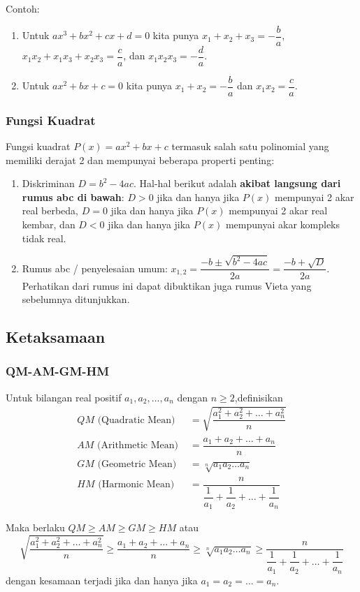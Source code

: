 Contoh:
\begin{enumerate}
\item Untuk $ax^3+bx^2+cx+d=0$ kita punya $x_1+x_2+x_3=-\dfrac{b}{a}$, $x_1x_2+x_1x_3+x_2x_3=\dfrac{c}{a}$, dan $x_1x_2x_3=-\dfrac{d}{a}$.
\item Untuk $ax^2+bx+c=0$ kita punya $x_1+x_2=-\dfrac{b}{a}$ dan $x_1x_2=\dfrac{c}{a}$.
\end{enumerate}
\subsubsection{Fungsi Kuadrat}
Fungsi kuadrat $P(x)=ax^2+bx+c$ termasuk salah satu polinomial yang memiliki derajat 2 dan mempunyai beberapa properti penting:
\begin{enumerate}
\item Diskriminan $D=b^2-4ac$. Hal-hal berikut adalah \textbf{akibat langsung dari rumus abc di bawah}: $D>0$ jika dan hanya jika $P(x)$ mempunyai 2 akar real berbeda,  $D=0$ jika dan hanya jika $P(x)$ mempunyai 2 akar real kembar, dan $D<0$ jika dan hanya jika $P(x)$ mempunyai akar kompleks tidak real.
\item Rumus abc / penyelesaian umum: $x_{1,2} = \dfrac{-b \pm \sqrt{b^2-4ac}}{2a} = \dfrac{-b+\sqrt{D}}{2a}$. Perhatikan dari rumus ini dapat dibuktikan juga rumus Vieta yang sebelumnya ditunjukkan.
\end{enumerate}

\subsection{Ketaksamaan}
\subsubsection{QM-AM-GM-HM}
Untuk bilangan real positif $a_1,a_2,\dots,a_n$ dengan $n\ge 2$,definisikan
\begin{align*}
    QM \text{ (Quadratic Mean) } &= \sqrt{\dfrac{a_1^2+a_2^2+\dots+a_n^2}{n}}\\
    AM \text{ (Arithmetic Mean) } &= \dfrac{a_1+a_2+\dots+a_n}{n}\\
    GM \text{ (Geometric Mean) } &=
    \sqrt[n]{a_1a_2\dots a_n}\\
    HM \text{ (Harmonic Mean) } &=
    \dfrac{n}{\dfrac{1}{a_1}+\dfrac{1}{a_2}+\dots+\dfrac{1}{a_n}}
\end{align*}

Maka berlaku $QM \ge AM \ge GM \ge HM$ atau 
$$\sqrt{\dfrac{a_1^2+a_2^2+\dots+a_n^2}{n}} \ge  \dfrac{a_1+a_2+\dots+a_n}{n}\ge
    \sqrt[n]{a_1a_2\dots a_n} \ge
    \dfrac{n}{\dfrac{1}{a_1}+\dfrac{1}{a_2}+\dots+\dfrac{1}{a_n}}$$
dengan kesamaan terjadi jika dan hanya jika $a_1=a_2=\dots =a_n$.
